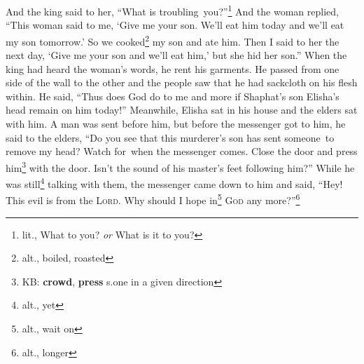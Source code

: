 \begin{inparaenum}
     And the king said to her, ``What is troubling\understood\ you?''\footnote{lit., What to you? \textit{or} What is it to you?} And the woman replied, ``This woman said to me, `Give me your son. We'll eat him today and we'll eat my son tomorrow.'%
     So we cooked\footnote{alt., boiled, roasted} my son and ate him. Then I said to her the next day, `Give me your son and we'll eat him,' but she hid her son.''%
     When the king had heard the woman's words, he rent his garments. He passed from one side of the wall to the other and the people saw that he had sackcloth on his flesh within.%
     He said, ``Thus does God do to me and more if Shaphat's son Elisha's head remain on him today!''%
     Meanwhile, Elisha sat in his house and the elders sat with him. A man was sent before him, but before the messenger got to him, he said to the elders, ``Do you see that this murderer's son has sent someone\understood\ to remove my head? Watch for\understood\ when the messenger comes. Close the door and press him\footnote{KB: \textbf{crowd}, \textbf{press} s.one in a given direction} with the door. Isn't the sound of his master's feet following him?''%
     While he was still\footnote{alt., yet} talking with them, the messenger came down to him and said, ``Hey! This evil is from the \textsc{Lord}. Why should I hope in\footnote{alt., wait on} \textsc{God} any more?''\footnote{alt., longer}%
\end{inparaenum}
